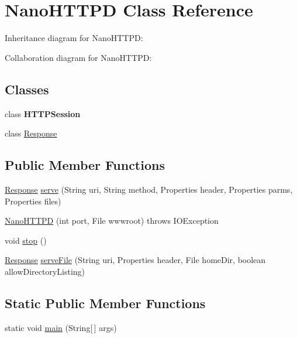\hypertarget{classcom_1_1axcoto_1_1shinjuku_1_1maki_1_1_nano_h_t_t_p_d}{\section{\-Nano\-H\-T\-T\-P\-D \-Class \-Reference}
\label{classcom_1_1axcoto_1_1shinjuku_1_1maki_1_1_nano_h_t_t_p_d}
}


\-Inheritance diagram for \-Nano\-H\-T\-T\-P\-D\-:


\-Collaboration diagram for \-Nano\-H\-T\-T\-P\-D\-:
\subsection*{\-Classes}
\begin{DoxyCompactItemize}
\item 
class {\bfseries \-H\-T\-T\-P\-Session}
\item 
class \hyperlink{classcom_1_1axcoto_1_1shinjuku_1_1maki_1_1_nano_h_t_t_p_d_1_1_response}{\-Response}
\end{DoxyCompactItemize}
\subsection*{\-Public \-Member \-Functions}
\begin{DoxyCompactItemize}
\item 
\hyperlink{classcom_1_1axcoto_1_1shinjuku_1_1maki_1_1_nano_h_t_t_p_d_1_1_response}{\-Response} \hyperlink{classcom_1_1axcoto_1_1shinjuku_1_1maki_1_1_nano_h_t_t_p_d_a0ef7299275c6b9aae10e13fdbe9df1da}{serve} (\-String uri, \-String method, \-Properties header, \-Properties parms, \-Properties files)
\item 
\hyperlink{classcom_1_1axcoto_1_1shinjuku_1_1maki_1_1_nano_h_t_t_p_d_af138b68dec0f6f8186c0f67973df7f0d}{\-Nano\-H\-T\-T\-P\-D} (int port, \-File wwwroot)  throws I\-O\-Exception 	
\item 
void \hyperlink{classcom_1_1axcoto_1_1shinjuku_1_1maki_1_1_nano_h_t_t_p_d_a8c528baf37154d347366083f0f816846}{stop} ()
\item 
\hyperlink{classcom_1_1axcoto_1_1shinjuku_1_1maki_1_1_nano_h_t_t_p_d_1_1_response}{\-Response} \hyperlink{classcom_1_1axcoto_1_1shinjuku_1_1maki_1_1_nano_h_t_t_p_d_a8a8f88d4952bcd30c8793d1151083d47}{serve\-File} (\-String uri, \-Properties header, \-File home\-Dir, boolean allow\-Directory\-Listing)
\end{DoxyCompactItemize}
\subsection*{\-Static \-Public \-Member \-Functions}
\begin{DoxyCompactItemize}
\item 
static void \hyperlink{classcom_1_1axcoto_1_1shinjuku_1_1maki_1_1_nano_h_t_t_p_d_a8b260eecbaabcef8473fd87ada040682}{main} (\-String\mbox{[}$\,$\mbox{]} args)
\end{DoxyCompactItemize}
